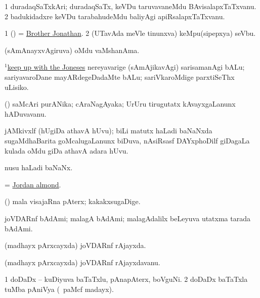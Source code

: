 \bentry
{}
\gl{\nA}
\bmng
\bnum
\num{1} duradaqSaTxkAri; duradaqSaTx, keVDu taruvavaneMdu BAvisalapxTaTxvanu. 
\num{2} badukidadxre keVDu tarabahudeMdu baliyAgi apiRsalapxTaTxvanu. 
\enum
\emng
\eentry

\bentry
{}
\gl{\nA}
\bmng
\bnum
\num{1} (\birx) = \hyperref{kandict_b.pdf}{B}{Brother Jonathan}{Brother Jonathan}. 
\num{2} (UTavAda meVle tinunxva) keMpu(sipepxya) seVbu. 
\enum
\emng
\eentry

\bentry
{}
\gl{\nA}
\bmng
(sAmAnayxvAgiruva) oMdu vaMshanAma. 
\emng

\noindent
\gl{\nuga}
\bmng
\hyperref{kandict_k.pdf}{K}{keep(1) nuga(42)}{$^1$keep up with the Joneses} nereyavarige (sAmAjikavAgi) sarisamanAgi bALu; sariyavaroDane mayARdegeDadaMte bALu; sariVkaroMdige parxtiSeThx uLisiko. 
\emng
\eentry

\bentry
{}
\gl{\nA}
\expl{\F}
\bmng
(\ca) saMcAri purANika; cAraNagAyaka; UrUru tirugutatx kAvayxgaLanunx hADuvavanu. 
\emng
\eentry

\bentry
{}
\gl{\nA}
\bmng
jAMkivxlf (hUgiDa athavA hUvu); biLi matutx haLadi baNaNxda sugaMdhaBarita goMcalugaLanunx biDuva, nAsiRsasf DAYxphoDilf giDagaLa kulada oMdu giDa athavA adara hUvu. 
\emng

\noindent
\gl{\pagu}
\bmng
{}  nusu haLadi baNaNx. 
\emng
\eentry

\bentry
{}
\gl{\nA}
\bmng
 = \hyperlink{Jordan almond}{Jordan almond}. 
\emng
\eentry

\bentry
{}
\gl{\nA}
\bmng
(\ashi) mala visajaRna pAterx; kakakxsugaDige. 
\emng
\eentry
 
\bentry
{}
\gl{\nA}
\bmng
joVDARnf bAdAmi; malagA bAdAmi; malagAdalilx beLeyuva utatxma tarada bAdAmi. 
\emng
\eentry

\bentry
{}
\gl{\gu}
\bmng
(madhayx pArxcayxda) joVDARnf rAjayxda. 
\emng
\eentry

\bentry
{}
\gl{\nA}
\bmng
(madhayx pArxcayxda) joVDARnf rAjayxdavanu. 
\emng
\eentry

\bentry
{}
\gl{\nA}
\bmng
\bnum
\num{1} doDaDx -- kuDiyuva baTaTxlu, pAnapAterx, boVguNi. 
\num{2} doDaDx baTaTxla tuMba pAniVya (\kanmu\ paMcf madayx). 
\enum
\emng
\eentry

